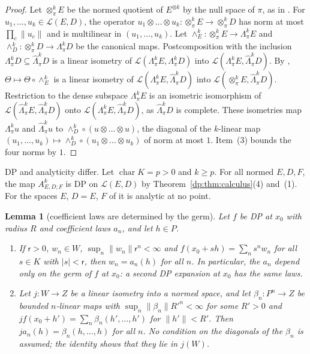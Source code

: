 \documentclass[11pt]{amsart}
\newtheorem{lemma}[theorem]{Lemma}
\theoremstyle{definition}
\theoremstyle{remark}
\numberwithin{equation}{section}
\newcommand{\cL}{\mathcal L}
\newcommand{\abs}[1]{\lvert #1\rvert}
\newcommand{\norm}[1]{\lVert #1\rVert}
\theoremstyle{plain}
\theoremstyle{definition}
\theoremstyle{plain}
\begin{document}
\begin{proof}
Let $\otimes^k_\pi E$ be the normed quotient of $E^{\otimes k}$ by the null space of $\pi$, as in \cite[Section~3.1]{I}. For $u_1,\dots,u_k\in\cL(E,D)$, the operator $u_1\otimes\dots\otimes u_k\colon\otimes^k_\pi E\to\otimes^k_\pi D$ has norm at most $\prod_c\norm{u_c}$ and is multilinear in $(u_1,\dots,u_k)$. Let $\wedge^k_E\colon\otimes^k_\pi E\to\Lambda^k_\pi E$ and $\wedge^k_D\colon\otimes^k_\pi D\to\Lambda^k_\pi D$ be the canonical maps. Postcomposition with the inclusion $\Lambda^k_\pi D\subseteq\widehat\Lambda^k_\pi D$ is a linear isometry of $\cL(\Lambda^k_\pi E,\Lambda^k_\pi D)$ into $\cL(\Lambda^k_\pi E,\widehat\Lambda^k_\pi D)$. By \cite[Lemma~3.7]{I}, $\Theta\mapsto\Theta\circ\wedge^k_E$ is a linear isometry of
$\cL(\Lambda^k_\pi E,\widehat\Lambda^k_\pi D)$ into $\cL(\otimes^k_\pi E,\widehat\Lambda^k_\pi D)$. Restriction to the dense
subspace $\Lambda^k_\pi E$ is an isometric isomorphism of $\cL(\widehat\Lambda^k_\pi E,\widehat\Lambda^k_\pi D)$ onto
$\cL(\Lambda^k_\pi E,\widehat\Lambda^k_\pi D)$, as $\widehat\Lambda^k_\pi D$ is complete. These isometries map
$\Lambda^k_\pi u$ and $\widehat\Lambda^k_\pi u$ to $\wedge^k_D\circ(u\otimes\dots\otimes u)$, the diagonal of the
$k$\nobreakdash-linear map $(u_1,\dots,u_k)\mapsto\wedge^k_D\circ(u_1\otimes\dots\otimes u_k)$ of norm at most $1$. Item~(3)
bounds the four norms by $1$.
\end{proof}

DP and analyticity differ. Let $\operatorname{char}K=p>0$ and $k\ge p$. For all normed $E,D,F$, the map $A^k_{E,D;F}$ is DP on $\cL(E,D)$ by
Theorem~\ref{dp:thm:calculus}(4) and~(1). For the spaces $E$, $D=E$, $F$ of \cite[Theorem~7.2(1)]{I} it is analytic at
no point.

\begin{lemma}[coefficient laws are determined by the germ]\label{dp:lem:coefficients-unique}
Let $f$ be DP at $x_0$ with radius $R$ and coefficient laws $a_n$, and let $h\in P$.
\begin{enumerate}
\item If $\mathsf r>0$, $w_n\in W$, $\sup_n\norm{w_n}\mathsf r^n<\infty$ and $f(x_0+sh)=\sum_ns^nw_n$ for all $s\in K$ with $\abs s<\mathsf r$, then $w_n=a_n(h)$ for all $n$. In particular, the $a_n$ depend only on the germ of $f$ at $x_0$: a second DP expansion at $x_0$ has the same laws.
\item Let $j\colon W\to Z$ be a linear isometry into a normed space, and let $\beta_n\colon P^n\to Z$ be bounded $n$\nobreakdash-linear maps with $\sup_n\norm{\beta_n}R'^n<\infty$ for some $R'>0$ and $jf(x_0+h')=\sum_n\beta_n(h',\dots,h')$ for $\norm{h'}<R'$. Then $ja_n(h)=\beta_n(h,\dots,h)$ for all $n$. No condition on the diagonals of the $\beta_n$ is assumed; the identity shows that they lie in $j(W)$.
\end{enumerate}
\end{lemma}
\end{document}

